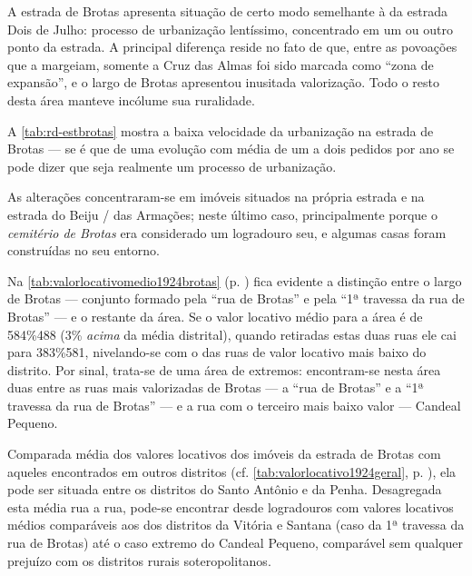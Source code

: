 
A estrada de Brotas apresenta situação de certo modo semelhante à da estrada Dois de Julho: processo de urbanização lentíssimo, concentrado em um ou outro ponto da estrada. A principal diferença reside no fato de que, entre as povoações que a margeiam, somente a Cruz das Almas foi sido marcada como ``zona de expansão'', e o largo de Brotas apresentou inusitada valorização. Todo o resto desta área manteve incólume sua ruralidade.

A \autoref{tab:rd-estbrotas} mostra a baixa velocidade da urbanização na estrada de Brotas --- se é que de uma evolução com média de um a dois pedidos por ano se pode dizer que seja realmente um processo de urbanização.





As alterações concentraram-se em imóveis situados na própria estrada e na estrada do Beiju / das Armações; neste último caso, principalmente porque o \textit{cemitério de Brotas} era considerado um logradouro seu, e algumas casas foram construídas no seu entorno.


Na \autoref{tab:valorlocativomedio1924brotas} (p. \pageref{tab:valorlocativomedio1924brotas}) fica evidente a distinção entre o largo de Brotas --- conjunto formado pela ``rua de Brotas'' e pela ``1ª travessa da rua de Brotas'' --- e o restante da área. Se o valor locativo médio para a área é de 584\%488 (3\% \textit{acima} da média distrital), quando retiradas estas duas ruas ele cai para 383\%581, nivelando-se com o das ruas de valor locativo mais baixo do distrito. Por sinal, trata-se de uma área de extremos: encontram-se nesta área duas entre as ruas mais valorizadas de Brotas  --- a ``rua de Brotas'' e a ``1ª travessa da rua de Brotas'' --- e a rua com o terceiro mais baixo valor --- Candeal Pequeno.

Comparada média dos valores locativos dos imóveis da estrada de Brotas com aqueles encontrados em outros distritos (cf. \autoref{tab:valorlocativo1924geral}, p. \pageref{tab:valorlocativo1924geral}), ela pode ser situada entre os distritos do Santo Antônio e da Penha. Desagregada esta média rua a rua, pode-se encontrar desde logradouros com valores locativos médios comparáveis aos dos distritos da Vitória e Santana (caso da 1ª travessa da rua de Brotas) até o caso extremo do Candeal Pequeno, comparável sem qualquer prejuízo com os distritos rurais soteropolitanos.


